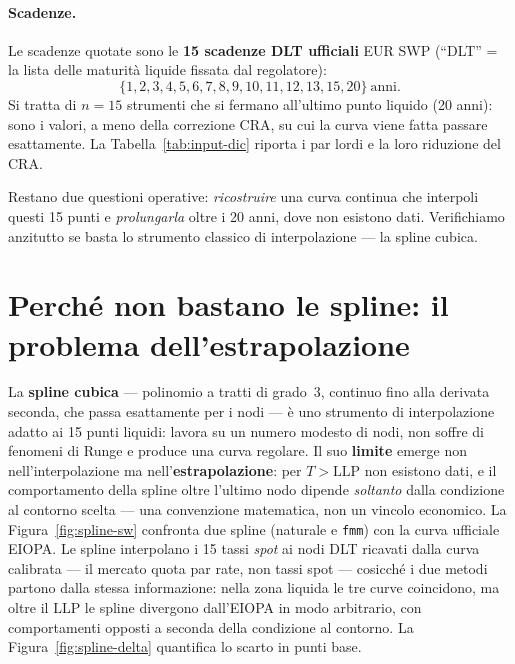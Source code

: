 \documentclass[11pt,a4paper]{article}
\theoremstyle{plain}
\theoremstyle{definition}
\theoremstyle{remark}
\newcommand{\LLP}{\ensuremath{\mathrm{LLP}}}
\begin{document}
\paragraph{Scadenze.} Le scadenze quotate sono le \textbf{15 scadenze DLT ufficiali} EUR SWP
(``DLT'' = la lista delle maturit\`a liquide fissata dal regolatore):
\[
  \{1,2,3,4,5,6,7,8,9,10,11,12,13,15,20\}\ \text{anni}.
\]
Si tratta di $n=15$ strumenti che si fermano all'ultimo punto liquido (20 anni): sono i valori,
a meno della correzione CRA, su cui la curva viene fatta passare esattamente. La
Tabella~\ref{tab:input-dic} riporta i par lordi e la loro riduzione del CRA.



Restano due questioni operative: \emph{ricostruire} una curva continua che interpoli questi
15 punti e \emph{prolungarla} oltre i 20 anni, dove non esistono dati. Verifichiamo
anzitutto se basta lo strumento classico di interpolazione --- la spline cubica.

\section{Perch\'e non bastano le spline: il problema dell'estrapolazione}
\label{sec:spline-limite}

La \textbf{spline cubica} --- polinomio a tratti di grado~3, continuo fino alla derivata
seconda, che passa esattamente per i nodi --- è uno strumento di interpolazione adatto ai
15 punti liquidi: lavora su un numero modesto di nodi, non soffre di fenomeni di Runge e
produce una curva regolare. Il suo \textbf{limite} emerge non nell'interpolazione ma
nell'\textbf{estrapolazione}: per $T > \LLP$ non esistono dati, e il comportamento della
spline oltre l'ultimo nodo dipende \emph{soltanto} dalla condizione al contorno scelta
--- una convenzione matematica, non un vincolo economico. La Figura~\ref{fig:spline-sw}
confronta due spline (naturale e \texttt{fmm}) con la curva ufficiale EIOPA. Le spline
interpolano i 15 tassi \emph{spot} ai nodi DLT ricavati dalla curva calibrata --- il
mercato quota par rate, non tassi spot --- cosicch\'e i due metodi partono dalla stessa
informazione: nella zona liquida le tre curve coincidono, ma oltre il $\LLP$ le spline
divergono dall'EIOPA in modo arbitrario, con comportamenti opposti a seconda della
condizione al contorno. La
Figura~\ref{fig:spline-delta} quantifica lo scarto in punti base.
\end{document}
